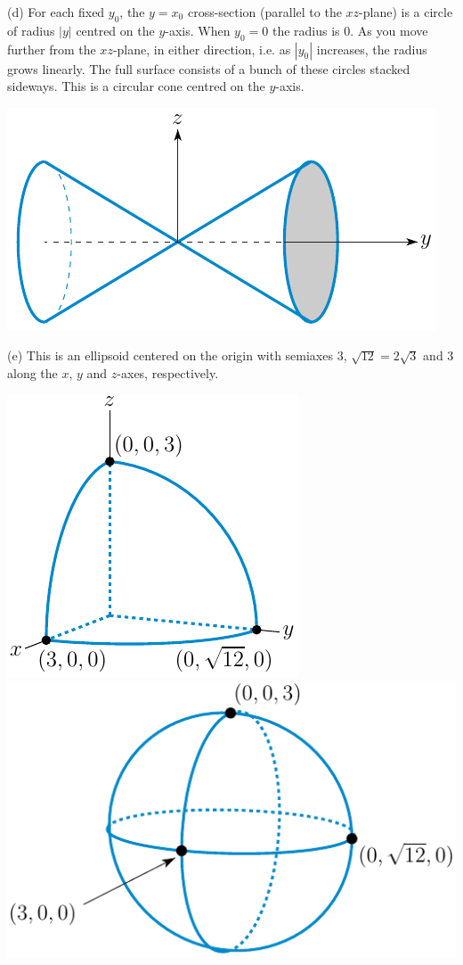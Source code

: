 \begin{solution}
(d)
For each fixed $y_0$, the $y=x_0$ cross-section (parallel to the $xz$-plane) 
is a circle of radius $|y|$ centred on the $y$-axis. When $y_0=0$ the radius 
is $0$. As you move further from the $xz$-plane, in either direction, 
i.e. as $|y_0|$ increases, the radius grows linearly. The full surface 
consists of a bunch of these circles stacked sideways. This is a 
circular cone centred on the $y$-axis. 
\begin{center}
     \includegraphics{fig/coneYY_r.pdf}%
\end{center}

(e)
This is an ellipsoid centered on the origin with semiaxes $3$, 
$\sqrt{12}=2\sqrt{3}$ and $3$ along the $x$, $y$ and $z$-axes, respectively.
\begin{center}
     \includegraphics{fig/ellipsoid_l.pdf}\qquad
     \includegraphics{fig/ellipsoid_r.pdf}
\end{center}


\end{solution}
